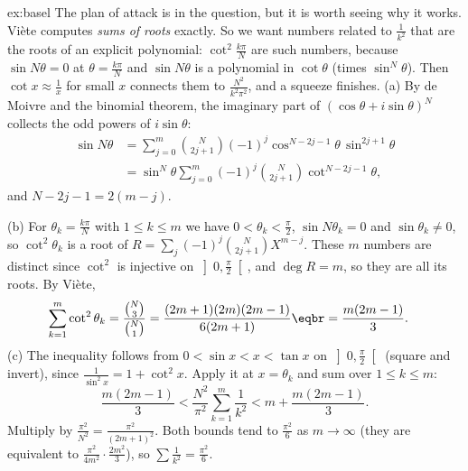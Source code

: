 \begin{solution}{ex:basel}
\idea The plan of attack is in the question, but it is worth seeing why it works. Vi\`ete computes \emph{sums of roots} exactly. So we want numbers related to $\frac1{k^2}$ that are the roots of an explicit polynomial: $\cot^2\frac{k\pi}N$ are such numbers, because $\sin N\theta=0$ at $\theta=\frac{k\pi}N$ and $\sin N\theta$ is a polynomial in $\cot\theta$ (times $\sin^N\theta$). Then $\cot x\approx\frac1x$ for small $x$ connects them to $\frac{N^2}{k^2\pi^2}$, and a squeeze finishes.
\writeup (a) By de Moivre and the binomial theorem, the imaginary part of $(\cos\theta+i\sin\theta)^N$ collects the odd powers of $i\sin\theta$:
\[
\begin{aligned}\sin N\theta&=\sum_{j=0}^m\binom N{2j+1}(-1)^j\cos^{N-2j-1}\theta\,\sin^{2j+1}\theta\\
&=\sin^N\theta\sum_{j=0}^m(-1)^j\binom N{2j+1}\cot^{N-2j-1}\theta,\end{aligned}
\]
and $N-2j-1=2(m-j)$.

(b) For $\theta_k=\frac{k\pi}N$ with $1\le k\le m$ we have $0<\theta_k<\frac\pi2$, $\sin N\theta_k=0$ and $\sin\theta_k\ne0$, so $\cot^2\theta_k$ is a root of
$R=\sum_j(-1)^j\binom N{2j+1}X^{m-j}$. These $m$ numbers are distinct since $\cot^2$ is injective on $\left]0,\frac\pi2\right[$, and $\deg R=m$, so they are all its roots.
By Vi\`ete,
\[
\begin{aligned}\sum_{k=1}^m\cot^2\theta_k&=\frac{\binom N3}{\binom N1}=\frac{(2m+1)(2m)(2m-1)}{6(2m+1)}\eqbr=\frac{m(2m-1)}3.\end{aligned}
\]
(c) The inequality follows from $0<\sin x<x<\tan x$ on $\left]0,\frac\pi2\right[$ (square and invert), since $\frac1{\sin^2x}=1+\cot^2x$.
Apply it at $x=\theta_k$ and sum over $1\le k\le m$:
\[
\frac{m(2m-1)}3<\frac{N^2}{\pi^2}\sum_{k=1}^m\frac1{k^2}<m+\frac{m(2m-1)}3.
\]
Multiply by $\frac{\pi^2}{N^2}=\frac{\pi^2}{(2m+1)^2}$. Both bounds tend to $\frac{\pi^2}6$ as $m\to\infty$ (they are equivalent to $\frac{\pi^2}{4m^2}\cdot\frac{2m^2}3$), so $\sum\frac1{k^2}=\frac{\pi^2}6$.
\end{solution}

